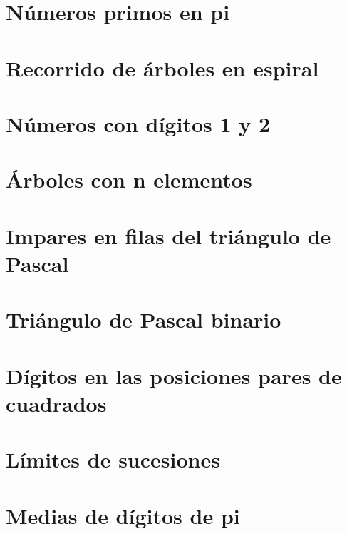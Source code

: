 \documentclass[a4paper,12pt,twoside]{book}
\begin{document}
\chapter{Números primos en pi}
\label{190124}

\chapter{Recorrido de árboles en espiral}
\label{190125}


\chapter{Números con dígitos 1 y 2}
\label{190128}

\chapter{Árboles con n elementos}
\label{190129}

\chapter{Impares en filas del triángulo de Pascal}
\label{190130}

\chapter{Triángulo de Pascal binario}
\label{190131}

\chapter{Dígitos en las posiciones pares de cuadrados}
\label{190201}


\chapter{Límites de sucesiones}
\label{190204}

\chapter{Medias de dígitos de pi}
\label{190205}
\end{document}
